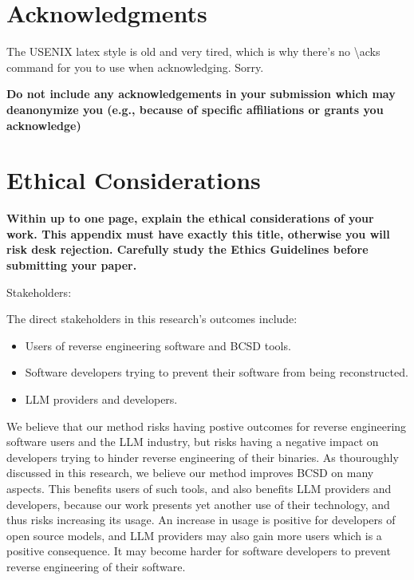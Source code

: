 \section*{Acknowledgments}

The USENIX latex style is old and very tired, which is why
there's no \textbackslash{}acks command for you to use when
acknowledging. Sorry.

\textbf{Do not include any acknowledgements in your submission which may deanonymize you (e.g., because of specific affiliations or grants you acknowledge)}

\cleardoublepage
\appendix
\section*{Ethical Considerations}
\textbf{Within up to one page, explain the ethical considerations of your work. This appendix must have exactly this title, otherwise you will risk desk rejection. Carefully study the Ethics Guidelines before submitting your paper.}

Stakeholders:

The direct stakeholders in this research's outcomes include:
\begin{itemize}
\item Users of reverse engineering software and BCSD tools.
\item Software developers trying to prevent their software from being reconstructed.
\item LLM providers and developers.
\end{itemize}

We believe that our method risks having postive outcomes for reverse engineering software users and
the LLM industry, but risks having a negative impact on developers trying to hinder reverse engineering of their binaries. As
thouroughly discussed in this research, we believe our method improves BCSD on many aspects. This benefits users of such tools,
and also benefits LLM providers and developers, because our work presents yet another use of their technology, and thus risks
increasing its usage. An increase in usage is positive for developers of open source models, and LLM providers may also gain more users
which is a positive consequence. It may become harder for software developers to prevent reverse engineering of their software.

